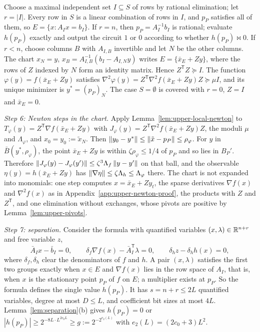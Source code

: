 Choose a maximal independent set $I\subseteq S$ of rows by rational
elimination; let $r=|I|$. Every row in $S$ is a linear combination of rows in
$I$, and $p_P$ satisfies all of them, so $E=\{x:A_Ix=b_I\}$. If $r=n$, then
$p_P=A_I^{-1}b_I$ is rational; evaluate $h(p_P)$ exactly and output the
circuit $1$ or $0$ according to whether $h(p_P)\bowtie0$. If $r<n$, choose
columns $B$ with $A_{I,B}$ invertible and let $N$ be the other columns. The
chart $x_N=y$, $x_B=A_{I,B}^{-1}(b_I-A_{I,N}y)$ writes $E=\{\bar x_E+Zy\}$,
where the rows of $Z$ indexed by $N$ form an identity matrix. Hence
$Z^{\mathsf T}Z\succeq I$. The function $\varphi(y)=f(\bar x_E+Zy)$ satisfies
$\nabla^2\varphi(y)=Z^{\mathsf T}\nabla^2f(\bar x_E+Zy)Z\succeq\mu I$, and its
unique minimizer is $y^*=(p_P)_N$. The case $S=\emptyset$ is covered with
$r=0$, $Z=I$ and $\bar x_E=0$.

\emph{Step 6: Newton steps in the chart.} Apply
Lemma~\ref{lem:upper-local-newton} to $T_\varphi(y)=Z^{\mathsf T}\nabla
f(\bar x_E+Zy)$ with $J_\varphi(y)=Z^{\mathsf T}\nabla^2f(\bar x_E+Zy)Z$, the
moduli $\mu$ and $\Lambda_\varphi$, and $x_0=y_0:=\tilde x_N$. Then
$\left\lVert y_0-y^*\right\rVert\le\left\lVert\tilde x-p_P\right\rVert\le\rho_\varphi$. For $y$ in
$\bar B(y^*,\rho_\varphi)$, the point $\bar x_E+Zy$ is within
$\zeta\rho_\varphi\le1/4$ of $p_P$ and so lies in $B_P'$. Therefore
$\left\lVert J_\varphi(y)-J_\varphi(y')\right\rVert\le\zeta^3\Lambda_f\left\lVert y-y'\right\rVert$ on that ball,
and the observable $\eta(y)=h(\bar x_E+Zy)$ has $\left\lVert\nabla\eta\right\rVert\le
\zeta\Lambda_h\le\Lambda_\varphi$ there. The chart is not expanded into
monomials: one step computes $x=\bar x_E+Zy_t$, the sparse derivatives
$\nabla f(x)$ and $\nabla^2f(x)$ as in Appendix~\ref{app:upper-newton-proof},
the products with $Z$ and $Z^{\mathsf T}$, and one elimination without
exchanges, whose pivots are positive by Lemma~\ref{lem:upper-pivots}.

\emph{Step 7: separation.} Consider the formula with quantified variables
$(x,\lambda)\in\mathbb R^{n+r}$ and free variable $z$,
\[
 \bar A_Ix-\bar b_I=0,\qquad
 \delta_f\nabla f(x)-\bar A_I^{\mathsf T}\lambda=0,\qquad
 \delta_hz-\delta_hh(x)=0,
\]
where $\delta_f,\delta_h$ clear the denominators of $f$ and $h$. A pair
$(x,\lambda)$ satisfies the first two groups exactly when $x\in E$ and
$\nabla f(x)$ lies in the row space of $A_I$, that is, when $x$ is the
stationary point $p_P$ of $f$ on $E$; a multiplier exists at $p_P$. So the
formula defines the single value $h(p_P)$. It has $s=n+r\le2L$ quantified
variables, degree at most $D\le L$, and coefficient bit sizes at most $4L$.
Lemma~\ref{lem:separation}(b) gives $h(p_P)=0$ or
$|h(p_P)|\ge2^{-8L\cdot L^{2c_0L}}\ge g:=2^{-2^{e_2(L)}}$ with
$e_2(L)=(2c_0+3)L^2$.


